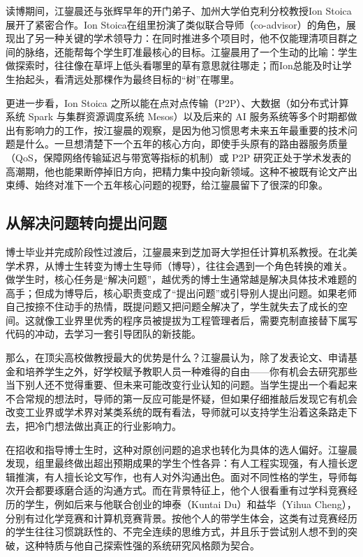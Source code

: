 \documentclass[UTF8,a4paper,11pt,fontset=fandol]{ctexart}
\begin{document}
读博期间，江鋆晨还与张辉早年的开门弟子、加州大学伯克利分校教授Ion Stoica展开了紧密合作。Ion Stoica在组里扮演了类似联合导师（co-advisor）的角色，展现出了另一种关键的学术领导力：在同时推进多个项目时，他不仅能理清项目群之间的脉络，还能帮每个学生盯准最核心的目标。江鋆晨用了一个生动的比喻：学生做探索时，往往像在草坪上低头看哪里的草有意思就往哪走；而Ion总能及时让学生抬起头，看清远处那棵作为最终目标的“树”在哪里。

更进一步看，Ion Stoica 之所以能在点对点传输（P2P）、大数据（如分布式计算系统 Spark 与集群资源调度系统 Mesos）以及后来的 AI 服务系统等多个时期都做出有影响力的工作，按江鋆晨的观察，是因为他习惯思考未来五年最重要的技术问题是什么。一旦想清楚下一个五年的核心方向，即使手头原有的路由器服务质量（QoS，保障网络传输延迟与带宽等指标的机制）或 P2P 研究正处于学术发表的高潮期，他也能果断停掉旧方向，把精力集中投向新领域。这种不被既有论文产出束缚、始终对准下一个五年核心问题的视野，给江鋆晨留下了很深的印象。

\subsection{从解决问题转向提出问题}
博士毕业并完成阶段性过渡后，江鋆晨来到芝加哥大学担任计算机系教授。在北美学术界，从博士生转变为博士生导师（博导），往往会遇到一个角色转换的难关。做学生时，核心任务是“解决问题”，越优秀的博士生通常越是解决具体技术难题的高手；但成为博导后，核心职责变成了“提出问题”或引导别人提出问题。如果老师自己按捺不住动手的热情，既提问题又把问题全解决了，学生就失去了成长的空间。这就像工业界里优秀的程序员被提拔为工程管理者后，需要克制直接替下属写代码的冲动，去学习一套引导团队的新技能。

那么，在顶尖高校做教授最大的优势是什么？江鋆晨认为，除了发表论文、申请基金和培养学生之外，好学校赋予教职人员一种难得的自由——你有机会去研究那些当下别人还不觉得重要、但未来可能改变行业认知的问题。当学生提出一个看起来不合常规的想法时，导师的第一反应可能是怀疑，但如果仔细推敲后发现它有机会改变工业界或学术界对某类系统的既有看法，导师就可以支持学生沿着这条路走下去，把冷门想法做出真正的行业影响力。

在招收和指导博士生时，这种对原创问题的追求也转化为具体的选人偏好。江鋆晨发现，组里最终做出超出预期成果的学生个性各异：有人工程实现强，有人擅长逻辑推演，有人擅长论文写作，也有人对外沟通出色。面对不同性格的学生，导师每次开会都要琢磨合适的沟通方式。而在背景特征上，他个人很看重有过学科竞赛经历的学生，例如后来与他联合创业的坤泰（Kuntai Du）和益华（Yihua Cheng），分别有过化学竞赛和计算机竞赛背景。按他个人的带学生体会，这类有过竞赛经历的学生往往习惯跳跃性的、不完全连续的思维方式，并且乐于尝试别人想不到的突破，这种特质与他自己探索性强的系统研究风格颇为契合。
\end{document}
